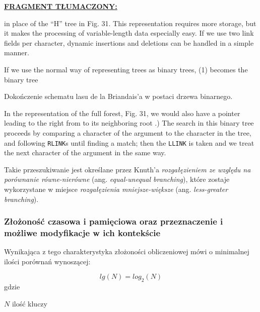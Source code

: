 	\ifsourcematerial	
	\begin{displayquote}
		\color{ao(english)}
		\underline{\textbf{FRAGMENT TŁUMACZONY:}} \newline
		
		in place of the “H” tree in Fig. 31. This representation requires more storage, but it makes the processing of variable-length data especially easy. If we use two
		link fields per character, dynamic insertions and deletions can be handled in a
		simple manner.
		
		If we use the normal way of representing trees as binary trees, (1) becomes
		the binary tree
		
		\elide Dokończenie schematu lasu de la Briandais'a w postaci drzewa binarnego. \elide
		
		In the representation of the full forest, Fig. 31, we would also have a pointer
		leading to the right from to its neighboring root .) The search in this binary
		tree proceeds by comparing a character of the argument to the character in the
		tree, and following \texttt{RLINK}s until finding a match; then the \texttt{LLINK} is taken and
		we treat the next character of the argument in the same way.
		
	\end{displayquote}
	\fi
	
	Takie przeszukiwanie jest określane przez Knuth'a \emph{rozgałęzieniem ze względu na porównanie równe-nierówne} (ang. \emph{equal-unequal branching}), które zostaje wykorzystane w miejsce \emph{rozgałęzienia mniejsze-większe} (ang. \emph{less-greater branching}).
	
	\subsubsection{Złożoność czasowa i pamięciowa oraz przeznaczenie i możliwe modyfikacje w ich kontekście}\label{sec:LasTriePrzeszukiwanieZlozonoscCzasowaIPamieciowaIPrzeznaczenie}
	
	Wynikająca z tego charakterystyka złożoności obliczeniowej mówi o minimalnej ilości porównań wynoszącej: 
	
	\begin{equation}\label{eq:zlozonoscCzasowaZrandomizowanaDrzewTrie}
	lg(N) = log_2(N)
	\end{equation}
	gdzie
	\begin{eqwhere}[2cm]
		\item[$N$] ilość kluczy
	\end{eqwhere}
	
